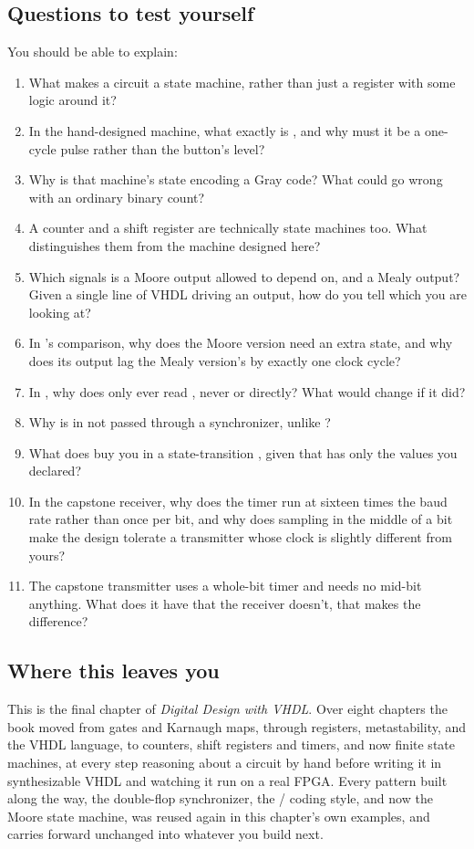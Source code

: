 \subsection*{Questions to test yourself}
You should be able to explain:
\begin{enumerate}
  \item What makes a circuit a state machine, rather than just a register with some logic around
    it?
  \item In the hand-designed machine, what exactly is , and why must it be a one-cycle
    pulse rather than the button's level?
  \item Why is that machine's state encoding a Gray code? What could go wrong with an ordinary
    binary count?
  \item A counter and a shift register are technically state machines too. What distinguishes them
    from the machine designed here?
  \item Which signals is a Moore output allowed to depend on, and a Mealy output? Given a single
    line of VHDL driving an output, how do you tell which you are looking at?
  \item In 's comparison, why does the Moore version need an extra state, and why does
    its output lag the Mealy version's by exactly one clock cycle?
  \item In , why does  only ever read , never
     or  directly? What would change if it did?
  \item Why is  in  not passed through a synchronizer, unlike
    ?
  \item What does  buy you in a state-transition , given that
     has only the values you declared?
  \item In the capstone receiver, why does the timer run at sixteen times the baud rate rather than
    once per bit, and why does sampling in the middle of a bit make the design tolerate a
    transmitter whose clock is slightly different from yours?
  \item The capstone transmitter uses a whole-bit timer and needs no mid-bit anything. What does it
    have that the receiver doesn't, that makes the difference?
\end{enumerate}

\subsection*{Where this leaves you}
This is the final chapter of \emph{Digital Design with VHDL}. Over eight chapters the book moved
from gates and Karnaugh maps, through registers, metastability, and the VHDL language, to counters,
shift registers and timers, and now finite state machines, at every step reasoning about a circuit
by hand before writing it in synthesizable VHDL and watching it run on a real FPGA. Every pattern
built along the way, the double-flop synchronizer, the / coding style, and
now the Moore state machine, was reused again in this chapter's own examples, and carries forward
unchanged into whatever you build next.
